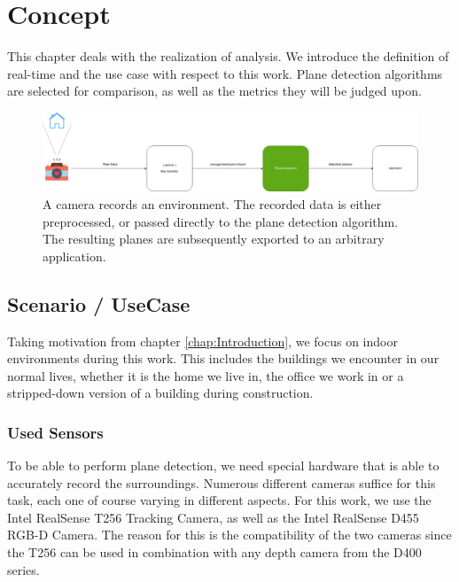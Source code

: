 \documentclass[main.tex]{subfiles}
\begin{document}
\chapter{Concept} \label{chap:Concept}

This chapter deals with the realization of analysis.
We introduce the definition of real-time and the use case with respect to this work.
Plane detection algorithms are selected for comparison, as well as the metrics they will be judged upon.

\begin{figure}[!ht]
	\centering
	\includegraphics[width=15 cm]{images/concept.png}
    \caption{A camera records an environment. The recorded data is either preprocessed, or passed directly to the plane detection algorithm.
    The resulting planes are subsequently exported to an arbitrary application.}
\end{figure}


\section{Scenario / UseCase}
Taking motivation from chapter \ref{chap:Introduction}, we focus on indoor environments during this work.
This includes the buildings we encounter in our normal lives, whether it is the home we live in, the office we work in or a stripped-down version of a building during construction.




\subsection{Used Sensors}
To be able to perform plane detection, we need special hardware that is able to accurately record the surroundings.
Numerous different cameras suffice for this task, each one of course varying in different aspects.
For this work, we use the Intel RealSense T256 Tracking Camera, as well as the Intel RealSense D455 RGB-D Camera.
The reason for this is the compatibility of the two cameras since the T256 can be used in combination with any depth camera from the D400 series.
\end{document}
